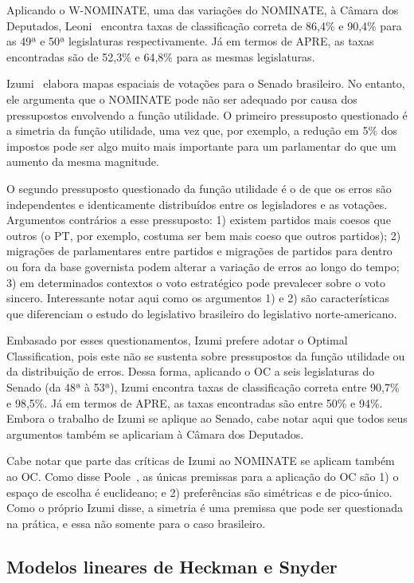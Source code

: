 \documentclass[a4paper, 12pt]{article}
\newcommand\nominate{NOMINATE\xspace}
\newcommand\wnominate{W-NOMINATE\xspace}
\begin{document}
Aplicando o \wnominate, uma das variações do \nominate, à Câmara dos Deputados, Leoni~\cite{leoni02cdep} encontra taxas de classificação correta de 86,4\% e 90,4\% para as 49ª e 50ª legislaturas respectivamente. Já em termos de APRE, as taxas encontradas são de 52,3\% e 64,8\% para as mesmas legislaturas.

Izumi~\cite{izumi2016senado} elabora mapas espaciais de votações para o Senado brasileiro. No entanto, ele argumenta que o \nominate pode não ser adequado por causa dos pressupostos envolvendo a função utilidade. O primeiro pressuposto questionado é a simetria da função utilidade, uma vez que, por exemplo, a redução em 5\% dos impostos pode ser algo muito mais importante para um parlamentar do que um aumento da mesma magnitude.

O segundo pressuposto questionado da função utilidade é o de que os erros são independentes e identicamente distribuídos entre os legisladores e as votações. Argumentos contrários a esse pressuposto: 1) existem partidos mais coesos que outros (o PT, por exemplo, costuma ser bem mais coeso que outros partidos); 2) migrações de parlamentares entre partidos e migrações de partidos para dentro ou fora da base governista podem alterar a variação de erros ao longo do tempo;  3) em determinados contextos o voto estratégico pode prevalecer sobre o voto sincero. Interessante notar aqui como os argumentos 1) e 2) são características que diferenciam o estudo do legislativo brasileiro do legislativo norte-americano.

Embasado por esses questionamentos, Izumi prefere adotar o Optimal Classification, pois este não se sustenta sobre pressupostos da função utilidade ou da distribuição de erros. Dessa forma, aplicando o OC a seis legislaturas do Senado (da 48ª à 53ª), Izumi encontra taxas de classificação correta entre 90,7\% e 98,5\%. Já em termos de APRE, as taxas encontradas são entre 50\% e 94\%. Embora o trabalho de Izumi se aplique ao Senado, cabe notar aqui que todos seus argumentos também se aplicariam à Câmara dos Deputados.

Cabe notar que parte das críticas de Izumi ao \nominate se aplicam também ao OC. Como disse Poole~\cite{poole2000oc}, as únicas premissas para a aplicação do OC são 1) o espaço de escolha é euclideano; e 2) preferências são simétricas e de pico-único. Como o próprio Izumi disse, a simetria é uma premissa que pode ser questionada na prática, e essa não somente para o caso brasileiro.

\subsection*{Modelos lineares de Heckman e Snyder}
\end{document}
